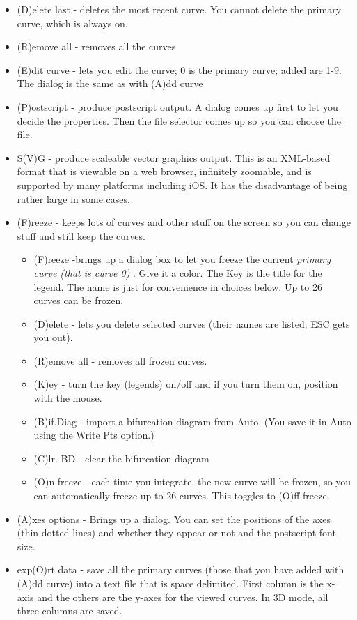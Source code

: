 \documentclass{article}
\begin{document}
\begin{itemize}
\begin{itemize}
\item (D)elete last - deletes the most recent curve. You cannot delete the primary curve, which is always on.
\item (R)emove all - removes all the curves
\item (E)dit curve - lets you edit the curve; 0 is the primary curve; added are 1-9.  The dialog is the same as with (A)dd curve
\item (P)ostscript - produce postscript output. A dialog comes up first to let you decide the properties. Then the file selector comes up so you can choose the file. 
\item S(V)G - produce scaleable vector graphics output. This is an XML-based format that is viewable on a web browser, infinitely zoomable, and is supported by many platforms including iOS. It has the disadvantage of being rather large in some cases.
\item (F)reeze - keeps lots of curves and other stuff on the screen so you can change stuff and still keep the curves.
\begin{itemize} 
\item (F)reeze -brings up a dialog box to let you freeze the current {\em primary curve (that is curve 0)} . Give it a color. The Key is the title for the legend. The name is just for convenience in choices below.  Up to 26 curves can be frozen.
\item (D)elete - lets you delete selected curves (their names are listed; ESC gets you out).
\item (R)emove all - removes all frozen curves. 
\item (K)ey - turn the key (legends) on/off and if you turn them on, position with the mouse.
\item (B)if.Diag - import a bifurcation diagram from Auto. (You save it in Auto using the Write Pts option.)
\item (C)lr. BD - clear the bifurcation diagram
\item (O)n freeze - each time you integrate, the new curve will be frozen, so you can automatically freeze up to 26 curves. This toggles to (O)ff freeze.
\end{itemize}
\item (A)xes options - Brings up a dialog. You can set the positions of the axes (thin dotted lines) and whether they appear or not and the postscript font size.
\item exp(O)rt data - save all the primary curves (those that you have added with (A)dd curve) into a text file that is space delimited. First column is the x-axis and the others are the y-axes for the  viewed curves. In 3D mode, all three columns are saved. 

\end{itemize}
\end{itemize}
\end{document}
